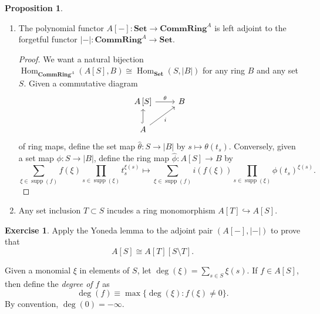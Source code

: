 \documentclass[10pt,letterpaper,cm]{nupset}
\theoremstyle{definition}
\theoremstyle{theorem}
\newtheorem{prop}[definition]{Proposition}
\newtheorem{exercise}[definition]{Exercise}
\theoremstyle{remark}
\newcommand{\1}{\mathbf{1}}
\newcommand{\0}{\vec 0}
\DeclareMathOperator{\Hom}{Hom}
\DeclareMathOperator{\supp}{supp}
\begin{document}
\begin{prop} $ $
\begin{enumerate}
\item The polynomial functor $A{\left[-\right]}: \mathbf{Set} \to \mathbf{CommRing}^A $ is left adjoint to the forgetful functor  $\left\lvert{-}\right\rvert: \mathbf{CommRing}^A \to \mathbf{Set}$.
\begin{proof}
We want a natural bijection $\Hom_{\mathbf{CommRing}^A}(A\left[S\right], B) \cong \Hom_{\mathbf{Set}}(S, \left\lvert{B}\right\rvert)$ for any ring $B$ and any set $S$.  Given a commutative diagram 
\[
\begin{tikzcd}
{A\left[S\right]} \arrow[r, "\theta"] & B \\
A \arrow[u, hook] \arrow[ru, "i"'] & 
\end{tikzcd}
\] of ring maps, define the set map $\hat{\theta} : S \to \left\lvert{B}\right\rvert$ by $s\mapsto \theta(t_s)$. Conversely, given a set map $\phi : S\to \left\lvert{B}\right\rvert$, define the ring map $\hat{\phi} : A\left[S\right] \to B$ by $$ \sum_{\xi \in \supp(f)} f(\xi)\prod_{s\in \supp(\xi)}t_s^{\xi(s)}  \mapsto \sum_{\xi \in \supp(f)} i(f(\xi))\prod_{s\in \supp(\xi)}\phi(t_s)^{\xi(s)}  .$$
\end{proof}
\item Any set inclusion $T \subset S$ incudes a ring monomorphism $A\left[T\right] \hookrightarrow A\left[S\right]$.
\end{enumerate}
\end{prop}

\begin{exercise}
Apply the Yoneda lemma to the adjoint pair $\left(A{\left[-\right]}, \left\lvert - \right\rvert\right)$ to prove that $$A\left[S\right]\cong A\left[T\right][S\setminus T].$$
\end{exercise}

\medskip


Given a monomial $\xi$ in elements of $S$, let $\deg(\xi) = \sum_{s\in S} \xi(s).$ If $f\in A\left[S\right]$, then define the \textit{degree of $f$} as $$ \deg(f)  \equiv \max \{ \deg (\xi) : f(\xi) \ne 0\}  .$$ By convention, $\deg(0) = {-\infty}$.
\end{document}
